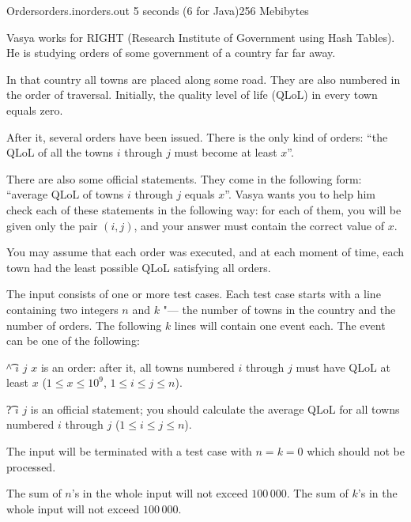
\begin{problem}{Orders}{orders.in}{orders.out}
{5 seconds (6 for Java)}{256 Mebibytes}{}

Vasya works for RIGHT (Research Institute of Government
using Hash Tables). He is studying orders of some government
of a country far far away.

In that country all towns are placed along some road. They
are also numbered in the order of traversal. Initially,
the quality level of life (QLoL) in every town equals zero.

After it, several orders have been issued. There is
the only kind of orders: ``the QLoL of all the towns $i$ through $j$
must become at least $x$''.

There are also some official statements. They come in the
following form: ``average QLoL of towns $i$ through $j$ equals $x$''.
Vasya wants you to help him check each of these statements in the following
way: for each of them, you will be given only the pair $(i, j)$,
and your answer must contain the correct value of $x$.

You may assume that each order was executed, and at each moment of time,
each town had the least possible QLoL satisfying all orders.

\InputFile

The input consists of one or more test cases.
Each test case starts with a line containing two
integers $n$ and $k$ "--- the number of towns in the
country and the number of orders. The following $k$ lines
will contain one event each. The event can be one of
the following:

\begin{shortnums}
  \item
    \t{\^} $i$ $j$ $x$ is an order: after it, all towns numbered $i$
    through $j$ must have QLoL at least $x$ ($1 \le x \le 10^9$,
    $1 \le i \le j \le n$).
  \item
    \vskip 4pt
    \t{?} $i$ $j$ is an official statement; you should calculate
    the average QLoL for all towns numbered $i$ through $j$
    ($1 \le i \le j \le n$).
\end{shortnums}

The input will be terminated with a test case with $n = k = 0$
which should not be processed.

The sum of $n$'s in the whole input will not exceed $100\,000$.
The sum of $k$'s in the whole input will not exceed $100\,000$.


\end{problem}
